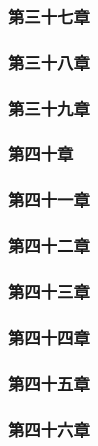 \subsubsection{第三十七章}



\subsubsection{第三十八章}



\subsubsection{第三十九章}



\subsubsection{第四十章}



\subsubsection{第四十一章}



\subsubsection{第四十二章}



\subsubsection{第四十三章}



\subsubsection{第四十四章}



\subsubsection{第四十五章}



\subsubsection{第四十六章}



